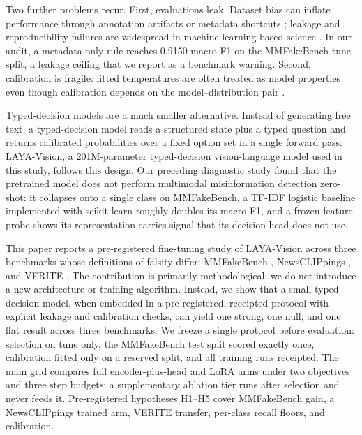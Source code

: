 \documentclass{article} %
\begin{document}
Two further problems recur. First, evaluations leak. Dataset bias can inflate performance through annotation artifacts or metadata shortcuts \citep{Gururangan2018AnnotationArtifacts, Gebru2018DatasheetsDatasets}; leakage and reproducibility failures are widespread in machine-learning-based science \citep{Kapoor2023LeakageReproducibility, Pineau2020ImprovingReproducibility, Kapoor2024ReformsConsensusbased}. In our audit, a metadata-only rule reaches 0.9150 macro-F1 on the MMFakeBench tune split, a leakage ceiling that we report as a benchmark warning. Second, calibration is fragile: fitted temperatures are often treated as model properties even though calibration depends on the model--distribution pair \citep{Guo2017CalibrationModern, Naeini2015ObtainingWell, Ovadia2019CanYou, Minderer2021RevisitingCalibration}.

Typed-decision models are a much smaller alternative. Instead of generating free text, a typed-decision model reads a structured state plus a typed question and returns calibrated probabilities over a fixed option set in a single forward pass. LAYA-Vision, a 201M-parameter typed-decision vision-language model used in this study, follows this design. Our preceding diagnostic study found that the pretrained model does not perform multimodal misinformation detection zero-shot: it collapses onto a single class on MMFakeBench, a TF-IDF logistic baseline implemented with scikit-learn \citep{Pedregosa2011ScikitlearnMachine} roughly doubles its macro-F1, and a frozen-feature probe shows its representation carries signal that its decision head does not use.

This paper reports a pre-registered fine-tuning study of LAYA-Vision across three benchmarks whose definitions of falsity differ: MMFakeBench \citep{Liu2024MmfakebenchMixedsource}, NewsCLIPpings \citep{Luo2021NewsclippingsAutomatic}, and VERITE \citep{Papadopoulos2023VeriteRobust}. The contribution is primarily methodological: we do not introduce a new architecture or training algorithm. Instead, we show that a small typed-decision model, when embedded in a pre-registered, receipted protocol with explicit leakage and calibration checks, can yield one strong, one null, and one flat result across three benchmarks. We freeze a single protocol before evaluation: selection on tune only, the MMFakeBench test split scored exactly once, calibration fitted only on a reserved split, and all training runs receipted. The main grid compares full encoder-plus-head and LoRA arms under two objectives and three step budgets; a supplementary ablation tier runs after selection and never feeds it. Pre-registered hypotheses H1--H5 cover MMFakeBench gain, a NewsCLIPpings trained arm, VERITE transfer, per-class recall floors, and calibration.
\end{document}
